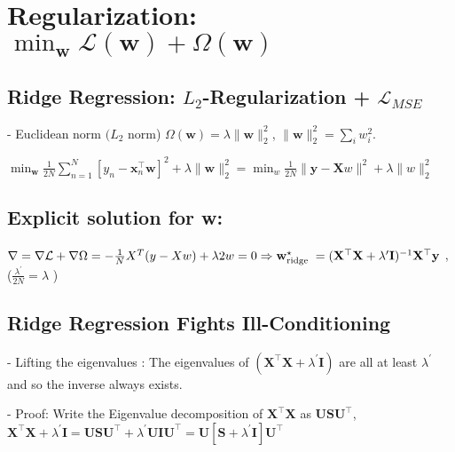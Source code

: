 \section{Regularization: $
\min _{\mathbf{w}} \mathcal{L}(\mathbf{w})+\Omega(\mathbf{w})
$}

\subsection*{Ridge Regression: $L_{2}$-Regularization + $\mathcal{L}_{MSE}$}
- Euclidean norm $(L_{2}$ norm) $
\Omega(\mathbf{w})=\lambda\|\mathbf{w}\|_{2}^{2}
$, $\|\mathbf{w}\|_{2}^{2}=\sum_{i} w_{i}^{2}$. 

$\min _{\mathbf{w}} \frac{1}{2 N} \sum_{n=1}^{N}[y_{n}-\mathbf{x}_{n}^{\top} \mathbf{w}]^{2}+\lambda\|\mathbf{w}\|_{2}^{2}
=\min _{w} \frac{1}{2 N}\|\mathbf{y}-\mathbf{X} w\|^{2}+\lambda\|w\|^{2}_{2}
$


\subsection*{Explicit solution for w:}

$\nabla = \nabla \mathcal{L} + \nabla\Omega = -\frac1NX^T(y-Xw) + \lambda2w = 0 \\\Rightarrow \mathbf{w}_{\text {ridge }}^{\star}=(\mathbf{X}^{\top} \mathbf{X}+\lambda^{\prime} \mathbf{I})^{-1} \mathbf{X}^{\top} \mathbf{y}$ , ($\frac{\lambda^{\prime}}{2 N}=\lambda$ )

\subsection*{Ridge Regression Fights Ill-Conditioning}
- Lifting the eigenvalues : The eigenvalues of $(\mathbf{X}^{\top} \mathbf{X}+\lambda^{\prime} \mathbf{I})$ are all at least $\lambda^{\prime}$ and so the inverse always exists.

- Proof: Write the Eigenvalue decomposition of $\mathbf{X}^{\top} \mathbf{X}$ as $\mathbf{U S U}^{\top}$,
$
\mathbf{X}^{\top} \mathbf{X}+\lambda^{\prime} \mathbf{I} =\mathbf{U S} \mathbf{U}^{\top}+\lambda^{\prime} \mathbf{U I U}^{\top} =\mathbf{U}[\mathbf{S}+\lambda^{\prime} \mathbf{I}] \mathbf{U}^{\top}
$



